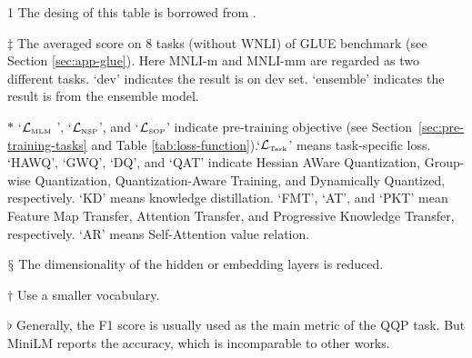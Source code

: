 \documentclass[fleqn]{SCYE-arxiv}
\begin{document}
\begin{multicols}{2}
\begin{table*}[t]
\begin{threeparttable}
\begin{tablenotes}
\item[1] The desing of this table is borrowed from \cite{xu2020bert,rogers2020primer}.
\item[$\ddagger$] The averaged score on 8 tasks (without WNLI) of GLUE benchmark (see Section \ref{sec:app-glue}). Here MNLI-m and MNLI-mm are regarded as two different tasks.
    `dev' indicates the result is on dev set. `ensemble' indicates the result is from the ensemble model.
 \item[$*$]  `$\mathcal{L}_{\textrm{\tiny MLM}}$ ', `$\mathcal{L}_{\textrm{\tiny NSP}}$', and `$\mathcal{L}_{\textrm{\tiny SOP}}$' indicate pre-training objective (see Section~\ref{sec:pre-training-tasks} and Table \ref{tab:loss-function}).`$\mathcal{L}_{\textrm{\tiny Task}}$' means task-specific loss.\\
     `HAWQ', `GWQ', `DQ', and `QAT' indicate Hessian AWare Quantization, Group-wise Quantization, Quantization-Aware Training, and Dynamically Quantized, respectively. `KD' means knowledge distillation. `FMT', `AT', and `PKT' mean Feature Map Transfer, Attention Transfer, and Progressive Knowledge Transfer, respectively. `AR' means Self-Attention value relation.
\item[$\mathsection$] The dimensionality of the hidden or embedding layers is reduced.
\item[$\dagger$] Use a smaller vocabulary.
\item[$\flat$] Generally, the F1 score is usually used as the main metric of the QQP task. But MiniLM reports the accuracy, which is incomparable to other works.

\end{tablenotes}
\end{threeparttable}
\end{table*}
\end{multicols}
\end{document}
